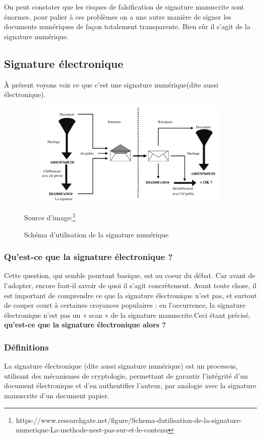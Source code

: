                 On peut constater que les risques de falsification de signature manuscrite sont énormes, pour palier à ces problèmes on a une autre manière de signer les documents numériques de façon totalement transparente. Bien sûr il s'agit de la signature numérique.
                
	    \subsection{Signature électronique}
			    À présent voyons voir ce que c'est une signature numérique(dite aussi électronique).
			    	
		    	\begin{figure}[H]
		 	    	\centering
		 	    	\includegraphics[width=16cm, height=5cm]{../imgs/signnum.png}
		 	    	\caption{Schéma d'utilisation de la signature numérique }
		 	    	{Source d'image:\footnote{https://www.researchgate.net/figure/Schema-dutilisation-de-la-signature-numerique-La-methode-nest-pas-sur-et-le-contenu}}
		 	    	\label{signum}
		    	\end{figure}
		    	
		    \subsubsection{Qu’est-ce que la signature électronique ?}
		        Cette question, qui semble pourtant basique, est au coeur du débat. Car avant de l’adopter, encore faut-il savoir de quoi il s’agit concrètement. Avant toute chose, il est important de comprendre ce que la signature électronique n’est pas, et surtout de couper court à certaines croyances populaires : en l’occurrence, la signature électronique n’est pas un « scan » de la signature manuscrite\cite{certeurope}.Ceci étant précisé, \textbf{ qu’est-ce que la signature électronique alors ?}
		    	
			    
			\subsubsection{Définitions}
			    La signature électronique (dite aussi signature numérique) est un processus, utilisant des mécanismes de cryptologie, permettant de garantir l'intégrité d'un document électronique et d'en authentifier l'auteur, par analogie avec la signature manuscrite d'un document papier.\\
			    
